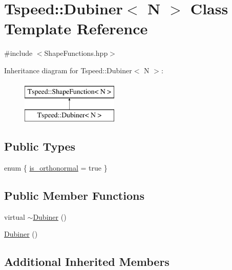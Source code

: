 \hypertarget{classTspeed_1_1Dubiner}{\section{Tspeed\-:\-:Dubiner$<$ N $>$ Class Template Reference}
\label{classTspeed_1_1Dubiner}
}


{\ttfamily \#include $<$Shape\-Functions.\-hpp$>$}

Inheritance diagram for Tspeed\-:\-:Dubiner$<$ N $>$\-:\begin{figure}[H]
\begin{center}
\leavevmode
\includegraphics[height=2.000000cm]{classTspeed_1_1Dubiner}
\end{center}
\end{figure}
\subsection*{Public Types}
\begin{DoxyCompactItemize}
\item 
enum \{ \hyperlink{classTspeed_1_1Dubiner_aee2eaa9dbcd2aa93d7d951a9c61a10e2a749d33573b6e1a4f9c56e9d5322fd70c}{is\-\_\-orthonormal} = true
 \}
\end{DoxyCompactItemize}
\subsection*{Public Member Functions}
\begin{DoxyCompactItemize}
\item 
virtual \hyperlink{classTspeed_1_1Dubiner_a3739d778c878f28ad63a062a210a69ae}{$\sim$\-Dubiner} ()
\item 
\hyperlink{classTspeed_1_1Dubiner_a0a4315462e09a1d2e4695b3f636ccd35}{Dubiner} ()
\end{DoxyCompactItemize}
\subsection*{Additional Inherited Members}



